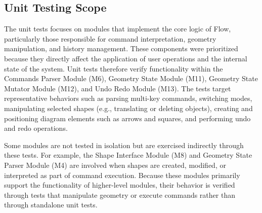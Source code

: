 \documentclass[12pt, titlepage]{article}
\begin{document}

\subsection{Unit Testing Scope}


The unit tests focuses on modules that implement the core logic of Flow, particularly those
responsible for command interpretation, geometry manipulation, and history management. These
components were prioritized because they directly affect the application of user operations
and the internal state of the system. Unit tests therefore verify functionality within the
Commands Parser Module (M6), Geometry State Module (M11), Geometry State Mutator Module
(M12), and Undo Redo Module (M13). The tests target representative behaviors such as
parsing multi-key commands, switching modes, manipulating selected shapes (e.g.,
translating or deleting objects), creating and positioning diagram elements such as
arrows and squares, and performing undo and redo operations.

Some modules are not tested in isolation but are exercised indirectly through these tests.
For example, the Shape Interface Module (M8) and Geometry State Parser Module (M4) are
involved when shapes are created, modified, or interpreted as part of command execution.
Because these modules primarily support the functionality of higher-level modules, their
behavior is verified through tests that manipulate geometry or execute commands rather than
through standalone unit tests.
\end{document}
